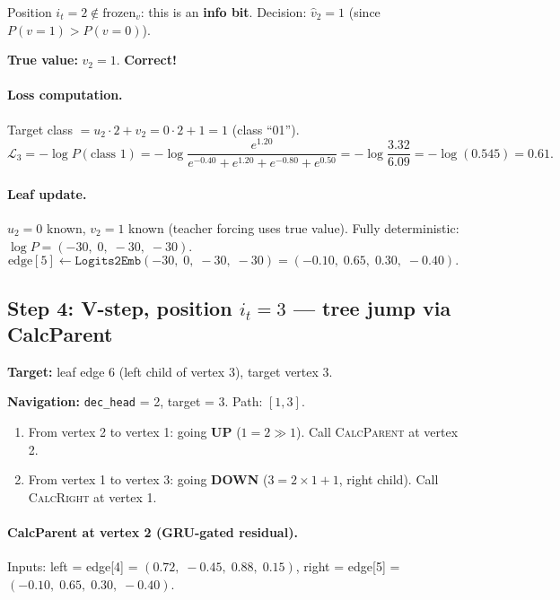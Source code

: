 \documentclass[11pt,a4paper]{article}
\newcommand{\calR}{\textsc{CalcRight}}
\newcommand{\calP}{\textsc{CalcParent}}
\begin{document}
Position $i_t = 2 \notin \text{frozen}_v$: this is an \textbf{info bit}.  Decision: $\hat{v}_2 = 1$ (since $P(v{=}1) > P(v{=}0)$).

\textbf{True value:} $v_2 = 1$.  \textbf{Correct!}

\paragraph{Loss computation.}
Target class $= u_2 \cdot 2 + v_2 = 0 \cdot 2 + 1 = 1$ (class ``01'').
\[
\mathcal{L}_3 = -\log P(\text{class 1}) = -\log \frac{e^{1.20}}{e^{-0.40} + e^{1.20} + e^{-0.80} + e^{0.50}} = -\log \frac{3.32}{6.09} = -\log(0.545) = 0.61.
\]

\paragraph{Leaf update.}
$u_2 = 0$ known, $v_2 = 1$ known (teacher forcing uses true value).  Fully deterministic: $\log P = (-30,\; 0,\; -30,\; -30)$.
\[
\text{edge}[5] \leftarrow \texttt{Logits2Emb}(-30,\; 0,\; -30,\; -30) = (-0.10,\; 0.65,\; 0.30,\; -0.40).
\]

\subsection{Step 4: V-step, position $i_t = 3$ --- tree jump via CalcParent}

\textbf{Target:} leaf edge 6 (left child of vertex 3), target vertex 3.

\textbf{Navigation:} \texttt{dec\_head} = 2, target = 3.  Path: $[1, 3]$.
\begin{enumerate}[nosep]
\item From vertex 2 to vertex 1: going \textbf{UP} ($1 = 2 \gg 1$).  Call \calP{} at vertex 2.
\item From vertex 1 to vertex 3: going \textbf{DOWN} ($3 = 2 \times 1 + 1$, right child).  Call \calR{} at vertex 1.
\end{enumerate}

\paragraph{CalcParent at vertex 2 (GRU-gated residual).}
Inputs: left = edge[4] = $(0.72,\; -0.45,\; 0.88,\; 0.15)$, right = edge[5] = $(-0.10,\; 0.65,\; 0.30,\; -0.40)$.
\end{document}
